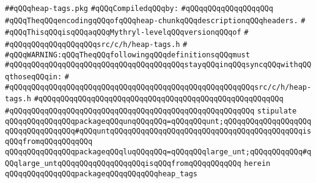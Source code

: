 \label{src/lib/compiler/back/low/main/main/heap-tags.pkg}
\verb|##qQQqheap-tags.pkg|\newline
\newline
\verb|#qQQqCompiledqQQqby:|\newline
\verb|#qQQqqQQqqQQqqQQqqQQq|\newline
\newline
\newline
\verb|#qQQqTheqQQqencodingqQQqofqQQqheap-chunkqQQqdescriptionqQQqheaders.|\newline
\verb|#|\newline
\verb|#qQQqThisqQQqisqQQqaqQQqMythryl-levelqQQqversionqQQqof|\newline
\verb|#|\newline
\verb|#qQQqqQQqqQQqqQQqqQQqsrc/c/h/heap-tags.h|\newline
\verb|#|\newline
\verb|#qQQqWARNING:qQQqTheqQQqfollowingqQQqdefinitionsqQQqmust|\newline
\verb|#qQQqqQQqqQQqqQQqqQQqqQQqqQQqqQQqqQQqqQQqstayqQQqinqQQqsyncqQQqwithqQQqthoseqQQqin:|\newline
\verb|#|\newline
\verb|#qQQqqQQqqQQqqQQqqQQqqQQqqQQqqQQqqQQqqQQqqQQqqQQqqQQqqQQqsrc/c/h/heap-tags.h|\newline
\verb|#qQQqqQQqqQQqqQQqqQQqqQQqqQQqqQQqqQQqqQQqqQQqqQQqqQQqqQQq|\newline
\verb|#qQQqqQQqqQQqqQQqqQQqqQQqqQQqqQQqqQQqqQQqqQQqqQQqqQQqqQQq|\newline
\newline
\verb|stipulate|\newline
\verb|qQQqqQQqqQQqqQQqpackageqQQqunqQQqqQQq=qQQqqQQqunt;qQQqqQQqqQQqqQQqqQQqqQQqqQQqqQQqqQQq#qQQquntqQQqqQQqqQQqqQQqqQQqqQQqqQQqqQQqqQQqqQQqqQQqisqQQqfromqQQqqQQqqQQq|\newline
\verb|qQQqqQQqqQQqqQQqpackageqQQqluqQQqqQQq=qQQqqQQqlarge_unt;qQQqqQQqqQQq#qQQqlarge_untqQQqqQQqqQQqqQQqqQQqisqQQqfromqQQqqQQqqQQq|\newline
\verb|herein|\newline
\newline
\verb|qQQqqQQqqQQqqQQqpackageqQQqqQQqqQQqheap_tags|\newline
